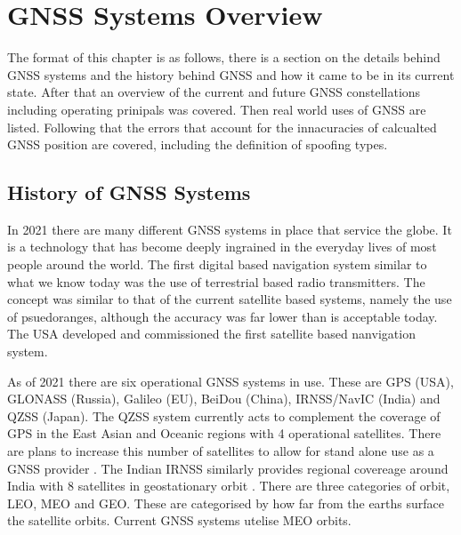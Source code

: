 
\chapter{GNSS Systems Overview} %

\label{Chapter2} %

The format of this chapter is as follows, there is a section on the details behind GNSS systems and the history behind GNSS and how it came to be in its current state. After that
an overview of the current and future GNSS constellations including operating prinipals was covered. Then real world uses of GNSS are listed. Following that the errors
that account for the innacuracies of calcualted GNSS position are covered, including the definition of spoofing types.


\section{History of GNSS Systems} \label{sec:GNSSHistory}
In 2021 there are many different GNSS systems in place that service the globe. It is a technology that has become deeply ingrained in the everyday lives of most
people around the world. The first digital based navigation system similar to what we know today was the use of terrestrial based radio transmitters. The concept was
similar to that of the current satellite based systems, namely the use of psuedoranges, although the accuracy was far lower than is acceptable today. The USA developed
and commissioned the first satellite based nanvigation system.

As of 2021 there are six operational GNSS systems in use. These are GPS (USA), GLONASS (Russia), Galileo (EU), BeiDou (China), IRNSS/NavIC (India) and QZSS (Japan). The
QZSS system currently acts to complement the coverage of GPS in the East Asian and Oceanic regions with 4 operational satellites. There are plans to increase this number
of satellites to allow for stand alone use as a GNSS provider \cite{RN47}. The Indian IRNSS similarly provides regional covereage around India with 8 satellites in
geostationary orbit \cite{RN55} . There are three categories of orbit, LEO, MEO and GEO. These are categorised by how far from the earths surface the satellite orbits.
Current GNSS systems utelise MEO orbits.

